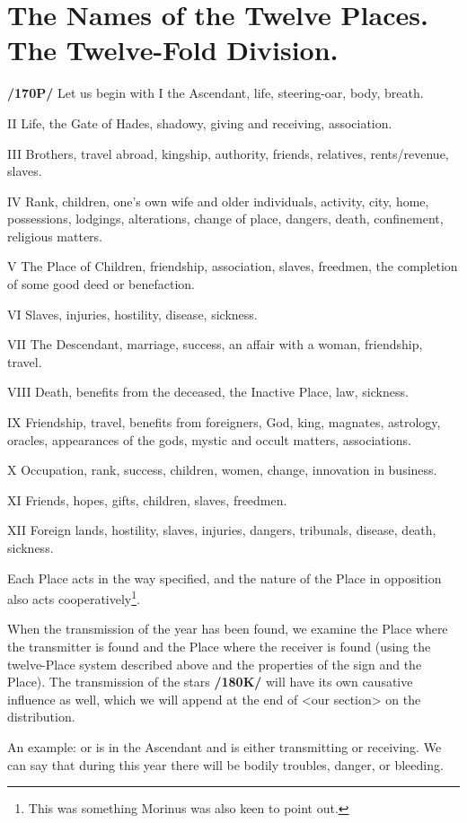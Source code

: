 \section{The Names of the Twelve Places. The Twelve-Fold Division.}
\textbf{/170P/} Let us begin with I the Ascendant, life, steering-oar, body, breath. 

II Life, the Gate of Hades, shadowy, giving and receiving, association.

III Brothers, travel abroad, kingship, authority, friends, relatives, rents/revenue, slaves.

IV Rank, children, one’s own wife and older individuals, activity, city, home, possessions, lodgings, alterations, change of place, dangers, death, confinement, religious matters.

V The Place of Children, friendship, association, slaves, freedmen, the completion of some good deed or benefaction.

VI Slaves, injuries, hostility, disease, sickness.

VII The Descendant, marriage, success, an affair with a woman, friendship, travel.

VIII Death, benefits from the deceased, the Inactive Place, law, sickness.

IX Friendship, travel, benefits from foreigners, God, king, magnates, astrology, oracles, appearances of the gods, mystic and occult matters, associations.

X Occupation, rank, success, children, women, change, innovation in business.

XI Friends, hopes, gifts, children, slaves, freedmen.

XII Foreign lands, hostility, slaves, injuries, dangers, tribunals, disease, death, sickness.

Each Place acts in the way specified, and the nature of the Place in opposition also acts cooperatively\footnote{This was something Morinus was also keen to point out.}.

When the transmission of the year has been found, we examine the Place where the transmitter is found and the Place where the receiver is found (using the twelve-Place system described above and the properties of the sign and the Place). The transmission of the stars \textbf{/180K/} will have its own causative influence as well, which we will append at the end of <our section> on the distribution.

An example: \Saturn\xspace or \Mars\xspace is in the Ascendant and is either transmitting or receiving. We can say that during this year there will be bodily troubles, danger, or bleeding. 

